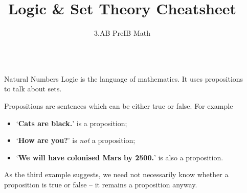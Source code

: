 \documentclass[final]{beamer}
\title{Logic \& Set Theory Cheatsheet}
\author{3.AB PreIB Math}
\institute[shortinst]{Adam Klepáč}
\newlength{\sepwidth}
\newlength{\colwidth}
\newcommand{\separatorcolumn}{\begin{column}{\sepwidth}\end{column}}
\begin{document}

\begin{frame}[t]
\begin{columns}[t]
\separatorcolumn

\begin{column}{\colwidth}

 \begin{block}{Natural Numbers}
  \alert{Logic} is the language of mathematics. It uses \alert{propositions} to
  talk about sets.

  Propositions are sentences which can be either true or false. For example
  \begin{itemize}[label=\textbullet,left=24pt]
   \item `\textbf{Cats are black.}' is a proposition;
   \item `\textbf{How are you?}' is \emph{not} a proposition;
   \item `\textbf{We will have colonised Mars by 2500.}' is also a proposition.
  \end{itemize}
 \end{block}
 As the third example suggests, we need not necessarily know whether a
 proposition is true or false -- it remains a proposition anyway.

 \vspace{1em}


\end{column}
\end{columns}
\end{frame}
\end{document}
